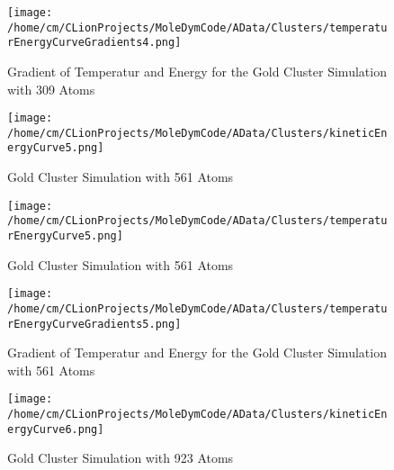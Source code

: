 \begin{figure}[!h] 
    \begin{center} 
        \texttt{[image: /home/cm/CLionProjects/MoleDymCode/AData/Clusters/temperaturEnergyCurveGradients4.png]} 
    \end{center} 
    \caption[Gradient of Temperatur and Energy for the Gold Cluster Simulation with 309 Atoms]{Gradient of Temperatur and Energy for the Gold Cluster Simulation with 309 Atoms} 
    \label{GoldClusterSimulationGradient309} 
\end{figure} 
 
\begin{figure}[!h] 
    \begin{center} 
        \texttt{[image: /home/cm/CLionProjects/MoleDymCode/AData/Clusters/kineticEnergyCurve5.png]} 
    \end{center} 
    \caption[Gold Cluster Simulation with 561 Atoms]{Gold Cluster Simulation with 561 Atoms} 
    \label{GoldClusterSimulationKineticTime561} 
\end{figure} 
 
\begin{figure}[!h] 
    \begin{center} 
        \texttt{[image: /home/cm/CLionProjects/MoleDymCode/AData/Clusters/temperaturEnergyCurve5.png]} 
    \end{center} 
    \caption[Gold Cluster Simulation with 561 Atoms]{Gold Cluster Simulation with 561 Atoms} 
    \label{GoldClusterSimulationTemperaturEnergy561} 
\end{figure} 
 
\begin{figure}[!h] 
    \begin{center} 
        \texttt{[image: /home/cm/CLionProjects/MoleDymCode/AData/Clusters/temperaturEnergyCurveGradients5.png]} 
    \end{center} 
    \caption[Gradient of Temperatur and Energy for the Gold Cluster Simulation with 561 Atoms]{Gradient of Temperatur and Energy for the Gold Cluster Simulation with 561 Atoms} 
    \label{GoldClusterSimulationGradient561} 
\end{figure} 
 
\begin{figure}[!h] 
    \begin{center} 
        \texttt{[image: /home/cm/CLionProjects/MoleDymCode/AData/Clusters/kineticEnergyCurve6.png]} 
    \end{center} 
    \caption[Gold Cluster Simulation with 923 Atoms]{Gold Cluster Simulation with 923 Atoms} 
    \label{GoldClusterSimulationKineticTime923} 
\end{figure} 
 
